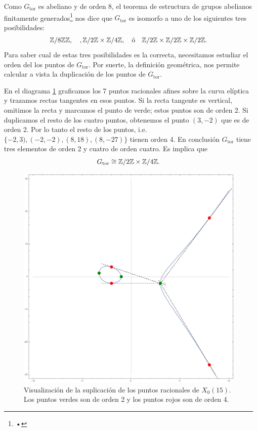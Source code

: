 Como $G_\mathrm{tor}$ es abeliano y de orden 8, el teorema de estructura de grupos abelianos finitamente generados\footnote{•} nos dice que $G_\mathrm{tor}$ es isomorfo a  uno de los siguientes tres posibilidades:
\[
	\mathbb{Z}/8\mathbb{Z}\mathbb{Z},\quad,\mathbb{Z}/2\mathbb{Z}\times\mathbb{Z}/4\mathbb{Z},\quad\text{ó}\quad \mathbb{Z}/2\mathbb{Z}\times\mathbb{Z}/2\mathbb{Z}\times\mathbb{Z}/2\mathbb{Z}.
\]
Para saber cual de estas tres posibilidades es la correcta, necesitamos estudiar el orden del los puntos de $G_\mathrm{tor}$. Por suerte, la definición geométrica, nos permite calcular a vista la duplicación de los puntos de $G_\mathrm{tor}$.

En el diagrama \ref{fig:orden-puntos-racionales} graficamos los 7 puntos racionales afines sobre la curva elíptica y trazamos rectas tangentes en esos puntos. Si la recta tangente es vertical, omitimos la recta y marcamos el punto de verde; estos puntos son de orden 2. Si duplicamos el resto de los cuatro puntos, obtenemos el punto $(3,-2)$ que es de orden 2. Por lo tanto el resto de los puntos, i.e. $\{-2,3),(-2,-2),(8,18),(8,-27)\}$ tienen orden 4. En conclusión $G_\mathrm{tor}$ tiene tres elementos de orden 2 y cuatro de orden cuatro. Es implica que
\[
	G_\mathrm{tor}\cong\mathbb{Z}/2\mathbb{Z}\times\mathbb{Z}/4\mathbb{Z}.
\]

\begin{figure}[!h]%
  \centering
  \includegraphics[scale=0.3]{figuras/orden-puntos-racionales}
  \caption{Visualización de la suplicación de los puntos racionales de $X_0(15)$. Los puntos verdes son de orden 2 y los puntos rojos son de orden 4.}
  \label{fig:orden-puntos-racionales}
\end{figure}%


